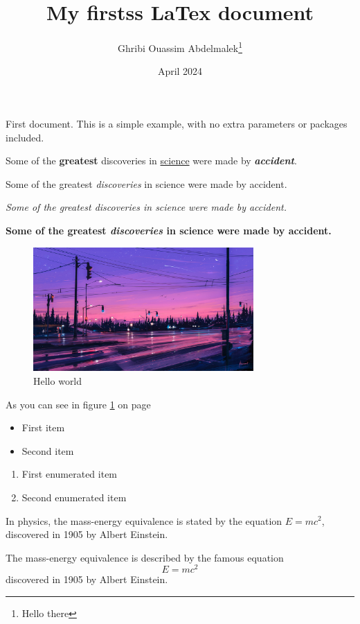\documentclass[10pt, a4paper]{article}
\title{My firstss LaTex document}
\author{Ghribi Ouassim Abdelmalek\thanks{Hello there}}
\date{April 2024}
\begin{document}
\maketitle
First document. This is a simple example, with no
extra parameters or packages included.

Some of the \textbf{greatest}
discoveries in \underline{science}
were made by \textbf{\textit{accident}}.

Some of the greatest \emph{discoveries} in science
were made by accident.

\textit{Some of the greatest \emph{discoveries}
    in science were made by accident.}

\textbf{Some of the greatest \emph{discoveries}
    in science were made by accident.}


\begin{figure}[h]
    \centering
    \includegraphics[width=0.75\textwidth]{alena-aenami-7p-m}
    \caption{Hello world}
    \label{fig:test-1}
\end{figure}

As you can see in figure \ref{fig:test-1} on page \pageref{fig:test-1}

\begin{itemize}
    \item First item
    \item Second item
\end{itemize}

\begin{enumerate}
    \item First enumerated item
    \item Second enumerated item
\end{enumerate}

In physics, the mass-energy equivalence is stated
by the equation $E=mc^2$, discovered in 1905 by Albert Einstein.

The mass-energy equivalence is described by the famous equation
\[ E=mc^2 \] discovered in 1905 by Albert Einstein.
\end{document}
